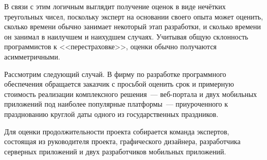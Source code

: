 В связи с этим логичным выглядит получение оценок в виде нечётких треугольных чисел, поскольку эксперт на основании своего опыта может оценить, сколько времени обычно занимает некоторый этап разработки, и сколько времени он занимал в наилучшем и наихудшем случаях. Учитывая общую склонность программистов к <<перестраховке>>, оценки обычно получаются асимметричными.

Рассмотрим следующий случай. В фирму по разработке программного обеспечения обращается заказчик с просьбой оценить срок и примерную стоимость реализации комплексного решения~--- веб-портала и двух мобильных приложений под наиболее популярные платформы~--- приуроченного к празднованию круглой даты одного из государственных праздников.

Для оценки продолжительности проекта собирается команда экспертов, состоящая из руководителя проекта, графического дизайнера, разработчика серверных приложений и двух разработчиков мобильных приложений.